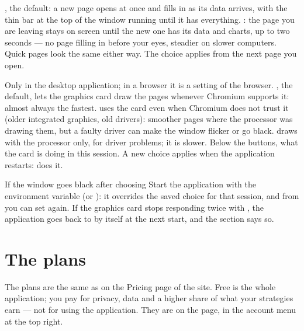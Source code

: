 \begin{description}[leftmargin = 1.4em, style = nextline, itemsep = 4pt]
  \item[\voce{Opening pages}] , the default: a new page
    opens at once and fills in as its data arrives, with the thin bar at the
    top of the window running until it has everything. :
    the page you are leaving stays on screen until the new one has its data
    and charts, up to two seconds --- no page filling in before your eyes,
    steadier on slower computers. Quick pages look the same either way. The
    choice applies from the next page you open.
  \item[\voce{Hardware acceleration}] Only in the desktop application; in a
    browser it is a setting of the browser. , the default,
    lets the graphics card draw the pages whenever Chromium supports it:
    almost always the fastest.  uses the card even when Chromium
    does not trust it (older integrated graphics, old drivers): smoother
    pages where the processor was drawing them, but a faulty driver can make
    the window flicker or go black.  draws with the processor only,
    for driver problems; it is slower. Below the buttons, what the card is
    doing in this session. A new choice applies when the application
    restarts:  does it.
\end{description}

\begin{attenzione}{If the window goes black after choosing }
Start the application with the environment variable 
(or ): it overrides the saved choice for that session, and from
 you can set  again. If the graphics card
stops responding twice with , the application goes back to
 by itself at the next start, and the section says so.
\end{attenzione}

\section{The plans}\label{sez:plans}

The plans are the same as on the Pricing page of the site. Free is the whole
application; you pay for privacy, data and a higher share of what your
strategies earn --- not for using the application. They are on the
 page, in the account menu at the top right.

